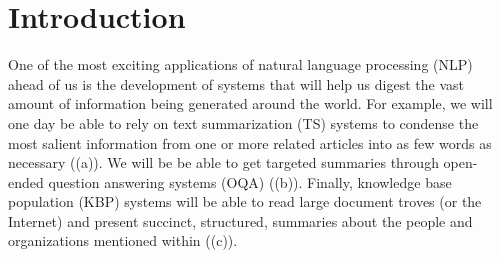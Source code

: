 
\chapter{\label{chap:intro} Introduction}

One of the most exciting applications of natural language processing (NLP) ahead of us is the development of systems that will help us digest the vast amount of information being generated around the world.
For example, we will one day be able to rely on 
text summarization (TS) systems to condense the most salient information from one or more related articles into as few words as necessary ((a)).
We will be be able to get targeted summaries through open-ended question answering systems (OQA) ((b)).
Finally, knowledge base population (KBP) systems  will be able to read large document troves (or the Internet) and present succinct, structured, summaries about the people and organizations mentioned within ((c)).

